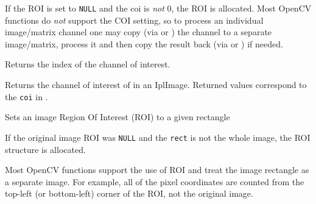 \begin{description}
\end{description}

If the ROI is set to \texttt{NULL} and the coi is \textit{not} 0, the ROI is allocated. Most OpenCV functions do \textit{not} support the COI setting, so to process an individual image/matrix channel one may copy (via  or ) the channel to a separate image/matrix, process it and then copy the result back (via  or ) if needed.

\label{GetImageCOI}

Returns the index of the channel of interest. 


\begin{description}
\end{description}

Returns the channel of interest of in an IplImage. Returned values correspond to the \texttt{coi} in .

\label{SetImageROI}

Sets an image Region Of Interest (ROI) to a given rectangle


\begin{description}
\end{description}

If the original image ROI was \texttt{NULL} and the \texttt{rect} is not the whole image, the ROI structure is allocated.

Most OpenCV functions support the use of ROI and treat the image rectangle as a separate image. For example, all of the pixel coordinates are counted from the top-left (or bottom-left) corner of the ROI, not the original image.

